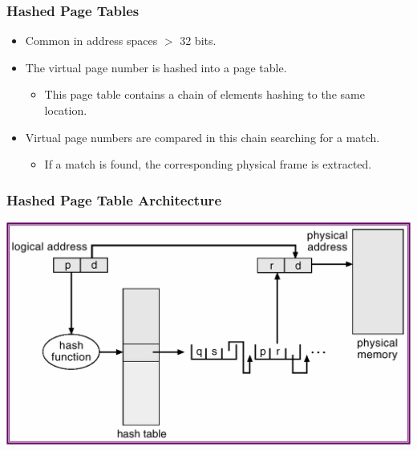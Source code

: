 \documentclass[CJKutf8,xcolor=pdftex,dvipsnames,table]{beamer}
\begin{document}
\begin{CJK*}{UTF8}{song}
\iffalse

  \begin{frame}
  \frametitle{Hashed Page Tables} \pause
  \begin{itemize}
  \item{Common in address spaces $>$ 32 bits.} \pause
  \item{The virtual page number is hashed into a page table.} \pause
    \begin{itemize}
    \item{This page table contains a chain of elements hashing to the same location.} \pause
    \end{itemize}
  \item{Virtual page numbers are compared in this chain searching for a match.} \pause
    \begin{itemize}
    \item{If a match is found, the corresponding physical frame is extracted.}
    \end{itemize}
  \end{itemize}
  \end{frame}
  
  \begin{frame}
  \frametitle{Hashed Page Table Architecture} \pause
  \begin{center}
    \includegraphics[scale=.5]{v6f9-14}
  \end{center}
  \end{frame}
  

\end{CJK*}
\end{document}
